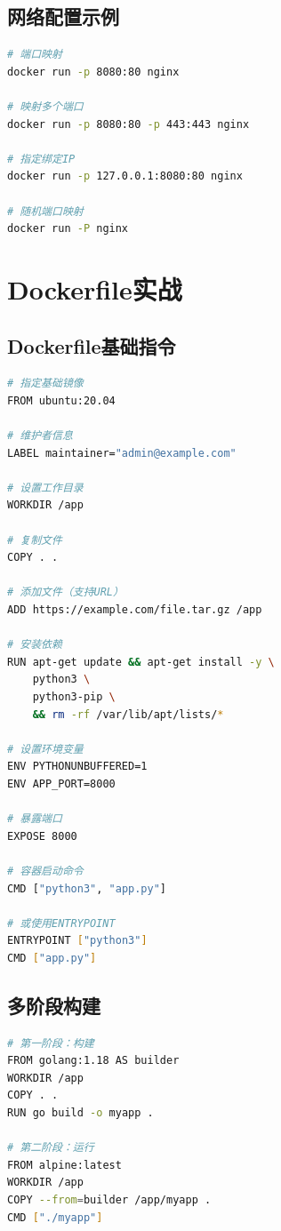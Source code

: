 \documentclass[12pt,UTF8]{ctexbook}
\begin{document}
\subsection{网络配置示例}

\begin{lstlisting}[language=bash]
# 端口映射
docker run -p 8080:80 nginx

# 映射多个端口
docker run -p 8080:80 -p 443:443 nginx

# 指定绑定IP
docker run -p 127.0.0.1:8080:80 nginx

# 随机端口映射
docker run -P nginx
\end{lstlisting}

\section{Dockerfile实战}
\label{sec:dockerfile}

\subsection{Dockerfile基础指令}

\begin{lstlisting}[language=bash]
# 指定基础镜像
FROM ubuntu:20.04

# 维护者信息
LABEL maintainer="admin@example.com"

# 设置工作目录
WORKDIR /app

# 复制文件
COPY . .

# 添加文件（支持URL）
ADD https://example.com/file.tar.gz /app

# 安装依赖
RUN apt-get update && apt-get install -y \
    python3 \
    python3-pip \
    && rm -rf /var/lib/apt/lists/*

# 设置环境变量
ENV PYTHONUNBUFFERED=1
ENV APP_PORT=8000

# 暴露端口
EXPOSE 8000

# 容器启动命令
CMD ["python3", "app.py"]

# 或使用ENTRYPOINT
ENTRYPOINT ["python3"]
CMD ["app.py"]
\end{lstlisting}

\subsection{多阶段构建}

\begin{lstlisting}[language=bash]
# 第一阶段：构建
FROM golang:1.18 AS builder
WORKDIR /app
COPY . .
RUN go build -o myapp .

# 第二阶段：运行
FROM alpine:latest
WORKDIR /app
COPY --from=builder /app/myapp .
CMD ["./myapp"]
\end{lstlisting}
\end{document}

